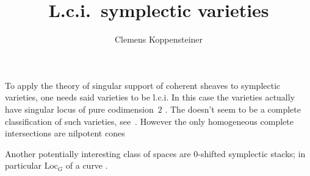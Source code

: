 \documentclass[english,no-theorem-numbers]{short-notes}
\title{L.c.i.~symplectic varieties}
\author{Clemens Koppensteiner}
\begin{document}
\maketitle

To apply the theory of singular support of coherent sheaves to symplectic varieties, one needs said varieties to be l.c.i.
In this case the varieties actually have singular locus of pure codimension~$2$ \cite[Corollary~1.5]{Fu:2006:SurveySymplectic}.
The doesn't seem to be a complete classification of such varieties, see~\cite[Problem~1]{Fu:2006:SurveySymplectic}.
However the only homogeneous complete intersections are nilpotent cones \cite{Namikawa:2013:HomogeneousSmplecticVarietiesOfCompleteIntersection}

Another potentially interesting class of spaces are 0-shifted symplectic stacks; in particular $\mathrm{Loc}_G$ of a curve \cite[Corollary~2.6]{PantevToenVaquieVezossi:arXiv:v4:ShiftedSymplecticStructures}.

\printbibliography
\end{document}
